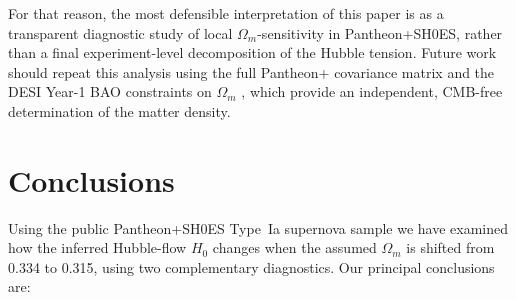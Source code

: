 \documentclass[fleqn,usenatbib,useAMS]{mnras}
\begin{document}
For that reason, the most defensible interpretation of this paper
is as a transparent diagnostic study of local $\Omega_m$-sensitivity
in Pantheon+SH0ES, rather than a final experiment-level
decomposition of the Hubble tension.
Future work should repeat this analysis using the full Pantheon+
covariance matrix and the DESI Year-1 BAO constraints on $\Omega_m$
\citep{desicollaboration2024}, which provide an independent,
CMB-free determination of the matter density.

\section{Conclusions}
\label{sec:conc}

Using the public Pantheon+SH0ES Type~Ia supernova sample we have
examined how the inferred Hubble-flow $H_0$ changes when the
assumed $\Omega_m$ is shifted from 0.334 to 0.315, using two
complementary diagnostics.
Our principal conclusions are:
\end{document}
